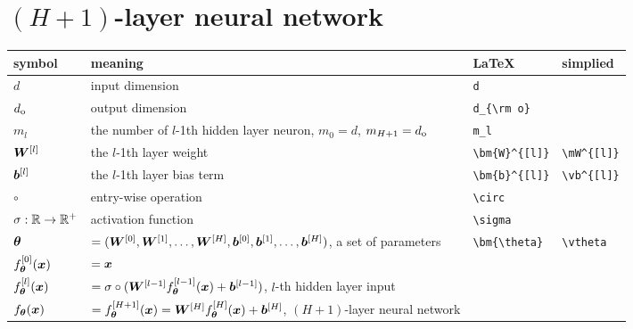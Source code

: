 \documentclass[]{report}
\begin{document}
\section{$(H+1)$-layer neural network }
\begin{center}
    \begin{tabular}{l|l|l|l}
        \hline
        symbol & meaning & \LaTeX & simplied\\
        \hline
        $d$ & input dimension & \verb!d! &  \\
        $d_{\rm o}$ & output dimension &\verb!d_{\rm o}! &  \\
        $m_l$& the number of $l$-1th hidden layer neuron, $m_0=d$, $m_{H+1} = d_{\rm o}$&\verb!m_l!\\
        $\bm{W}^{[l]}$ & the $l$-1th layer weight &\verb!\bm{W}^{[l]}!&\verb!\mW^{[l]}!\\
        $\bm{b}^{[l]}$ & the $l$-1th layer bias term&\verb!\bm{b}^{[l]}!&\verb!\vb^{[l]}!\\
        $\circ$&entry-wise operation&\verb!\circ!\\
        $\sigma:\mathbb{R}\to\mathbb{R}^+$& activation function &\verb!\sigma!\\
        $\bm{\theta}$&$=(\bm{W}^{[0]},\bm{W}^{[1]},\ldots,\bm{W}^{[H]},\bm{b}^{[0]},\bm{b}^{[1]},\ldots,\bm{b}^{[H]})$, a set of parameters&\verb!\bm{\theta}!&\verb!\vtheta!\\
        $f_{\bm{\theta}}^{[0]}(\bm{x})$&$=\bm{x}$\\
        $f_{\bm{\theta}}^{[l]}(\bm{x})$&$=\sigma\circ(\bm{W}^{[l-1]} f_{\bm{\theta}}^{[l-1]}(\bm{x}) + \bm{b}^{[l-1]})$,  $l$-th hidden layer input \\
         $f_{\bm{\theta}}(\bm{x})$&$=f_{\bm{\theta}}^{[H+1]}(\bm{x})=\bm{W}^{[H]} f_{\bm{\theta}}^{[H]}(\bm{x}) + \bm{b}^{[H]}$,  $(H+1)$-layer neural network\\
    
    \end{tabular}
\end{center}
\end{document}

